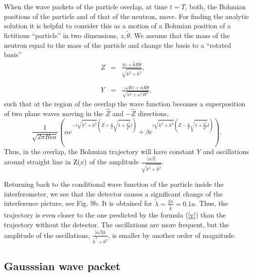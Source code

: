 \documentclass[preprint,tightenlines]{elsarticle}
\begin{document}
When the wave packets of the particle overlap, at time $t=T$, both,
the Bohmian positions of the particle and of that of the neutron, move. For
finding the analytic solution it is helpful to consider this as a
motion of a Bohmian position of a fictitious ``particle'' in two dimensions, $z,\tilde{\theta}$.
We assume that the mass of the neutron equal to the mass of the particle and change the basis to a ``rotated basis''
 \begin{eqnarray}
Z & = & \frac{kz+\tilde{k}R\tilde{\theta}}{\sqrt{k^{2}+\tilde{k^{2}}}},\nonumber \\
 & ~\\
Y & = & \frac{-\omega Rz+uR\tilde{\theta}}{\sqrt{u^{2}+\omega^{2}R^{2}}},\nonumber
\end{eqnarray}
 such that at the region of the overlap the wave function becomes
a superposition of two plane waves moving in the $\hat{Z}$ and $-\hat{Z}$
directions,
\begin{equation}
\frac{1}{\sqrt{2\pi R\epsilon a}}\left(\alpha e^{-i\sqrt{k^{2}+\tilde{k^{2}}}\left(Z+\frac{u}{2}\sqrt{1+\frac{\tilde{k^{2}}}{k^{2}}}t\right)}+
\beta e^{i\sqrt{k^{2}+\tilde{k^{2}}}\left(Z-\frac{u}{2}\sqrt{1+\frac{\tilde{k^{2}}}{k^{2}}}t\right )}\right).\label{Zofx}\end{equation}
 Thus, in the overlap, the Bohmian trajectory will have constant $Y$
and oscillations around straight line in ${\rm Z}(x)$ of the amplitude
$\frac{|\alpha\beta|}{\sqrt{k^{2}+\tilde{k^{2}}}}$.




Returning back to the conditional wave function of the particle inside the interferometer, we see that the detector causes a significant change of the interference picture, see Fig. 9b. It is obtained for $\tilde{\lambda}=\frac{2\pi}{\tilde{k}}=0.1a$.  Thus, the trajectory is even
closer to the one predicted by the formula (\ref{v}) than the trajectory without the detector. The oscillations
are more frequent, but the amplitude of the oscillations, $\frac{|\alpha\beta|k}{ \tilde{k}^{2}+ k^{2}}$, is  smaller by another order of magnitude.


\subsection{ Gausssian wave packet}
\end{document}
